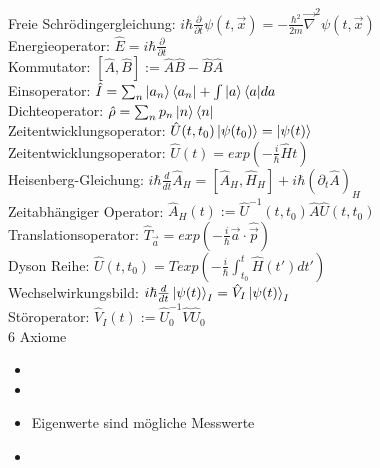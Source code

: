 \documentclass{article}
\begin{document}
Freie Schr\"odingergleichung: $i \hbar \frac{\partial}{\partial t} \psi(t, \vec{x}) = -\frac{\hbar^2}{2m}\vec{\nabla}^2\psi(t, \vec{x}) $ \\

Energieoperator: $\hat{E} = i \hbar \frac{\partial}{\partial t} $ \\

Kommutator: $[\hat{A}, \hat{B}] := \hat{A}\hat{B} - \hat{B}\hat{A}$ \\

Einsoperator: $\hat{I}=\sum_n{\ket{a_n}\bra{a_n}} + \int{\ket{a}\bra{a}}da$ \\

Dichteoperator: $\hat{\rho}=\sum_n{p_n \ket{n}\bra{n}}$ \\

Zeitentwicklungsoperator: $\hat{U}(t, t_0)\ket{\psi(t_0)} = \ket{\psi(t)}$ \\

Zeitentwicklungsoperator: $\hat{U}(t) = exp(-\frac{i}{\hbar}\hat{H}t) $ \\

Heisenberg-Gleichung: $i \hbar \frac{d}{dt} \hat{A}_H = \left[ \hat{A}_H, \hat{H}_H \right] + i \hbar \left( \partial_t \hat{A} \right)_H $\\

Zeitabh\"angiger Operator: $\hat{A}_H(t) := \hat{U}^{-1}(t, t_0) \hat{A} \hat{U}(t, t_0)$ \\

Translationsoperator: $\hat{T}_{\vec{a}} = exp \left( - \frac{i}{\hbar} \vec{a} \cdot \hat{\vec{p}} \right)$ \\

Dyson Reihe:  $\hat{U}(t, t_0) = T exp\left(-\frac{i}{\hbar} \int_{t_0}^t{\hat{H}(t')}dt' \right)$ \\

Wechselwirkungsbild:  $i \hbar \frac{d}{dt} \ket{\psi(t)}_I = \hat{V}_I \ket{\psi(t)}_I$ \\

St\"oroperator: $\hat{V}_I(t) := \hat{U}_0^{-1} \hat{V} \hat{U}_0$ \\

6 Axiome \\ 
\begin{itemize}
\item 
\item
\item Eigenwerte sind m\"ogliche Messwerte
\item
\end{itemize}
\end{document}
